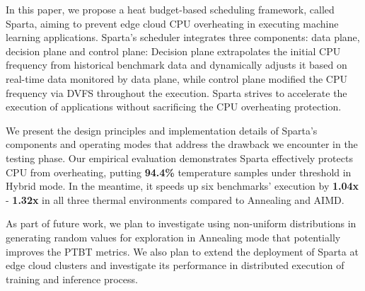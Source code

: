In this paper, we propose a heat budget-based scheduling framework, called Sparta, aiming to prevent edge cloud CPU overheating in executing machine learning applications. Sparta's scheduler integrates three components: data plane, decision plane and control plane: Decision plane extrapolates the initial CPU frequency from historical benchmark data and dynamically adjusts it based on real-time data monitored by data plane, while control plane modified the CPU frequency via DVFS throughout the execution. Sparta strives to accelerate the execution of applications without sacrificing the CPU overheating protection.  

We present the design principles and implementation details of Sparta's components and operating modes that address the drawback we encounter in the testing phase. Our empirical evaluation demonstrates Sparta effectively protects CPU from overheating, putting \textbf{94.4\%} temperature samples under threshold in Hybrid mode. In the meantime, it speeds up six benchmarks' execution by \textbf{1.04x} - \textbf{1.32x} in all three thermal environments compared to Annealing and AIMD.

As part of future work, we plan to investigate using non-uniform distributions in generating random values for exploration in Annealing mode that potentially improves the PTBT metrics. We also plan to extend the deployment of Sparta at edge cloud clusters and investigate its performance in distributed execution of training and inference process. 
